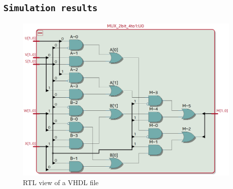 \documentclass{article}
\let\oldsubsection\subsection
\renewcommand{\subsection}[1]{%
  \oldsubsection{\texttt{#1}}%
  \setcounter{subsubsection}{-1}%
}
\begin{document}
\subsection{Simulation results}
\begin{figure}[h] %
    \centering
    \includegraphics[width=1\textwidth]{Figures/Example_RTL.png}
    \caption{RTL view of a VHDL file} %
    \label{fig:mux} %
\end{figure}

\clearpage
\end{document}
